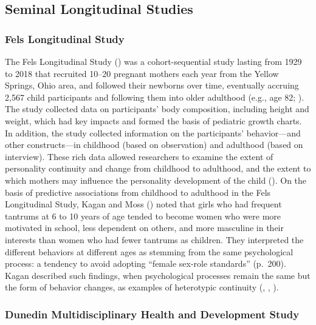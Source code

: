 \documentclass[
  american,
  letterpaper,
  12pt]{article}
\begin{document}
\subsection{Seminal Longitudinal
Studies}\label{seminal-longitudinal-studies}

\subsubsection{Fels Longitudinal Study}\label{fels-longitudinal-study}

The Fels Longitudinal Study () was
a cohort-sequential study lasting from 1929 to 2018 that recruited
10--20 pregnant mothers each year from the Yellow Springs, Ohio area,
and followed their newborns over time, eventually accruing 2,567 child
participants and following them into older adulthood (e.g., age 82;
). The study collected
data on participants' body composition, including height and weight,
which had key impacts and formed the basis of pediatric growth charts.
In addition, the study collected information on the participants'
behavior---and other constructs---in childhood (based on observation)
and adulthood (based on interview). These rich data allowed researchers
to examine the extent of personality continuity and change from
childhood to adulthood, and the extent to which mothers may influence
the personality development of the child (). On the basis of predictive associations from childhood
to adulthood in the Fels Longitudinal Study, Kagan and Moss
() noted that girls who had frequent
tantrums at 6 to 10 years of age tended to become women who were more
motivated in school, less dependent on others, and more masculine in
their interests than women who had fewer tantrums as children. They
interpreted the different behaviors at different ages as stemming from
the same psychological process: a tendency to avoid adopting ``female
sex-role standards'' (p.~200). Kagan described such findings, when
psychological processes remain the same but the form of behavior
changes, as examples of heterotypic continuity
(, ,
).

\subsubsection{Dunedin Multidisciplinary Health and Development
Study}\label{dunedin-multidisciplinary-health-and-development-study}
\end{document}
